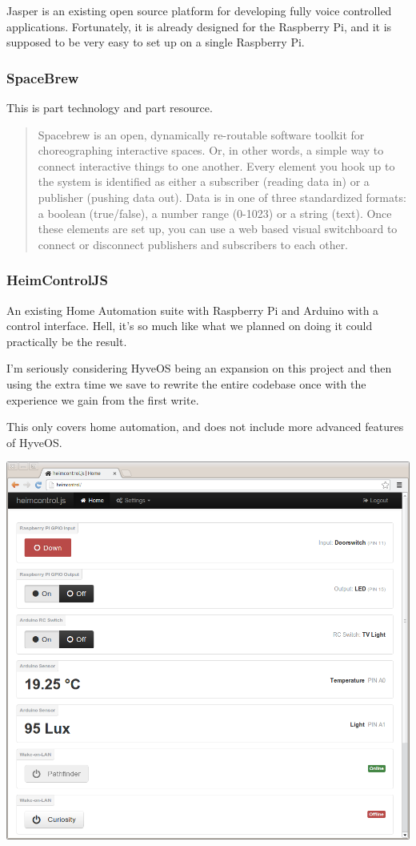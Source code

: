 			Jasper is an existing open source platform for developing fully voice controlled applications.
			Fortunately, it is already designed for the Raspberry Pi, and it is supposed to be very easy to set up on a single Raspberry Pi.
			
		\subsubsection{SpaceBrew}
		
			This is part technology and part resource.
			
			\begin{quote}
				Spacebrew is an open, dynamically re-routable software toolkit for choreographing interactive spaces. Or, in other words, a simple way to connect interactive things to one another. Every element you hook up to the system is identified as either a subscriber (reading data in) or a publisher (pushing data out). Data is in one of three standardized formats: a boolean (true/false), a number range (0-1023) or a string (text). Once these elements are set up, you can use a web based visual switchboard to connect or disconnect publishers and subscribers to each other.
			\end{quote}
			
		\subsubsection{HeimControlJS}
		
			An existing Home Automation suite with Raspberry Pi and Arduino with a control interface.
			Hell, it's so much like what we planned on doing it could practically be the result.
			
			I'm seriously considering HyveOS being an expansion on this project and then using the extra time we save to rewrite the entire codebase once with the experience we gain from the first write.
			
			This only covers home automation, and does not include more advanced features of HyveOS.
			
			\begin{center}
				\includegraphics[width=.5\textwidth]{gfx/heimcontrol.png}
			\end{center}

